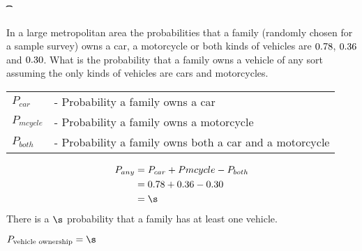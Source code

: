 
\ADD\va\vb\t
\SUBTRACT\t\vc\s

\question[2] In a large metropolitan area the probabilities that a family 
(randomly chosen for a sample survey) owns a car, a motorcycle or both
kinds of vehicles are $0.78$, $0.36$ and $0.30$. What is the
probability that a family owns a vehicle of any sort assuming the only
kinds of vehicles are cars and motorcycles.


\watchout

\begin{solution}[\mcq]
  \begin{tabular}{ll}
    $P_{car}$    &- Probability a family owns a car \\
    $P_{mcycle}$ &- Probability a family owns a motorcycle \\
    $P_{both}$   &- Probability a family owns both a car and a motorcycle\\
  \end{tabular}
  \begin{align}
    P_{any} &= P_{car} + P{mcycle} - P_{both} \\
            &= \va +\vb - \vc \\
            &= \s
  \end{align}
  There is a $\s$ probability that a family has at least one vehicle.
	
\end{solution}

\ifprintanswers\begin{codex}
  $P_{\text{vehicle ownership}} = \s$
\end{codex}\fi
